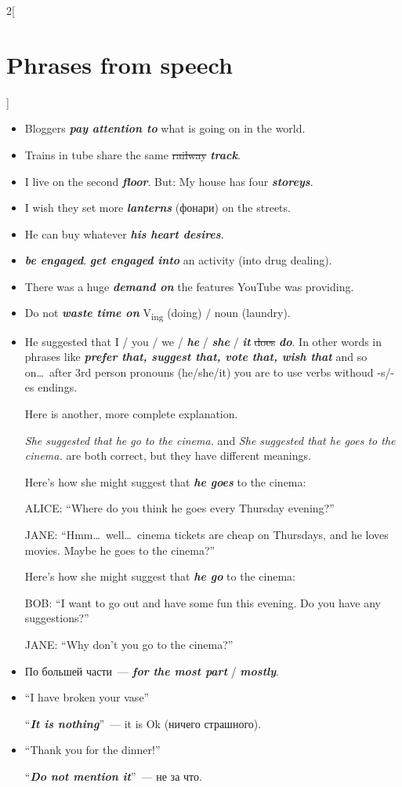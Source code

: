 \documentclass[10pt,a4paper]{article}
\newlength{\OriginalParIndent}
\newcommand\ex[1]{\textit{\textbf{{#1}}}}           %
\newenvironment{ItemizeWithOrigParIndent}
    {\begin{itemize}[leftmargin=\OriginalParIndent]}
    {\end{itemize}}
\begin{document}
\begin{multicols}{2}[\section{Phrases from speech}]
\begin{ItemizeWithOrigParIndent}
   \item Bloggers \ex{pay attention to} what is going on in the world.
   \item Trains in tube share the same \sout{railway} \ex{track}.
   \item I live on the second \ex{floor}. But: My house has four \ex{storeys}.
   \item I wish they set more \ex{lanterns} (фонари) on the streets.
   \item He can buy whatever \ex{his heart desires}.
   \item \ex{be engaged}. \ex{get engaged into} an activity (into drug dealing).
   \item There was a huge \ex{demand on} the features YouTube was providing.
   \item Do not \ex{waste time on} V\textsubscript{ing} (doing) / noun (laundry).
   \item He suggested that I / you / we / \ex{he} / \ex{she} / \ex{it} \sout{does} \ex{do}. In other words in phrases like \ex{prefer that, suggest that, vote that, wish that} and so on\dots\ after 3rd person pronouns (he/she/it) you are to use verbs withoud -s/-es endings.

   Here is another, more complete explanation.

   \textit{She suggested that he go to the cinema.} and \textit{She suggested that he goes to the cinema.} are both correct, but they have different meanings.

   Here's how she might suggest that \ex{he goes} to the cinema:

   ALICE: ``Where do you think he goes every Thursday evening?''

   JANE: ``Hmm\dots\ well\dots\ cinema tickets are cheap on Thursdays, and he loves movies. Maybe he goes to the cinema?''

   Here's how she might suggest that \ex{he go} to the cinema:

   BOB: ``I want to go out and have some fun this evening. Do you have any suggestions?''

   JANE: ``Why don't you go to the cinema?''

   \item По большей части~--- \ex{for the most part} / \ex{mostly}.
   \item ``I have broken your vase''

   ``\ex{It is nothing}''~--- it is Ok (ничего страшного).

   \item ``Thank you for the dinner!''

   ``\ex{Do not mention it}''~--- не за что.


\end{ItemizeWithOrigParIndent}
\end{multicols}
\end{document}
